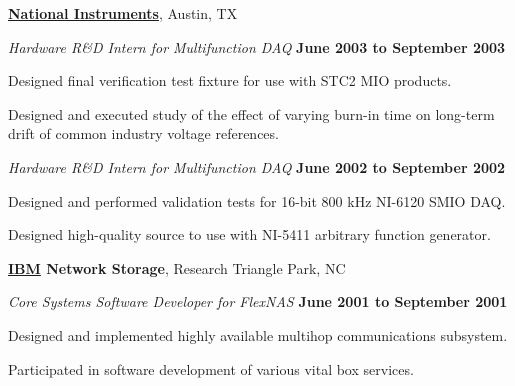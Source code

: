 \documentclass[10pt]{article}
\newcommand{\halfblankline}{\quad\vspace{-0.5\baselineskip}\pagebreak[3]}
\begin{document}
\halfblankline

\href{http://www.ni.com/}{\textbf{National Instruments}},
Austin, TX
\begin{outerlist}

\item[] \textit{Hardware R\&D Intern for Multifunction DAQ}%
        \hfill \textbf{June 2003 to September 2003}
\begin{innerlist}
\item Designed final verification test fixture for use with STC2 MIO
        products.
\item Designed and executed study of the effect of varying burn-in time
        on long-term drift of common industry voltage references.
\end{innerlist}

\item[] \textit{Hardware R\&D Intern for Multifunction DAQ}%
        \hfill \textbf{June 2002 to September 2002}
\begin{innerlist}
\item Designed and performed validation tests for 16-bit 800 kHz
        NI-6120 SMIO DAQ.

\item Designed high-quality source to use with NI-5411 arbitrary
        function generator.
\end{innerlist}

\end{outerlist}

\halfblankline

\textbf{\href{http://www.ibm.com/}{IBM} Network Storage},
Research Triangle Park, NC
\begin{outerlist}

\item[] \textit{Core Systems Software Developer for FlexNAS}%
        \hfill \textbf{June 2001 to September 2001}
\begin{innerlist}
\item Designed and implemented highly available multihop communications
        subsystem.
\item Participated in software development of various vital box
        services.
\end{innerlist}

\end{outerlist}

\halfblankline
\end{document}
